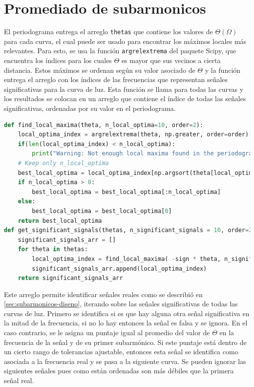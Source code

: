 \section{Promediado de subarmonicos}\label{sec:subarmonicos-implementacion}
El periodograma entrega el arreglo \texttt{thetas} que contiene los valores de $\Theta(\Omega)$ para cada curva, el cual puede ser usado para encontrar los máximos locales más relevantes. Para esto, se usa la función \texttt{argrelextrema} del paquete Scipy, que encuentra los índices para los cuales $\Theta$ es mayor que sus vecinos a cierta distancia. Estos máximos se ordenan según su valor asociado de $\Theta$ y la función entrega el arreglo con los índices de las frecuencias que representan señales significativas para la curva de luz. Esta función se llama para todas las curvas y los resultados se colocan en un arreglo que contiene el índice de todas las señales significativas, ordenadas por su valor en el periodograma.
\begin{lstlisting}[language=Python]
def find_local_maxima(theta, n_local_optima=10, order=2):
    local_optima_index = argrelextrema(theta, np.greater, order=order)[0]
    if(len(local_optima_index) < n_local_optima):
        print("Warning: Not enough local maxima found in the periodogram")
    # Keep only n_local_optima
    best_local_optima = local_optima_index[np.argsort(theta[local_optima_index])][::-1]
    if n_local_optima > 0:
        best_local_optima = best_local_optima[:n_local_optima]
    else:
        best_local_optima = best_local_optima[0]
    return best_local_optima
def get_significant_signals(thetas, n_significant_signals = 10, order=2, signal_diff_tolerance = 0.2, sign=-1, spacing=100):
    significant_signals_arr = []
    for theta in thetas:
        local_optima_index = find_local_maxima( -sign * theta, n_significant_signals, order)
        significant_signals_arr.append(local_optima_index)
    return significant_signals_arr
\end{lstlisting}
Este arreglo permite identificar señales reales como se describió en \ref{sec:subarmonicos-diseno}, iterando sobre las señales significativas de todas las curvas de luz. Primero se identifica si es que hay alguna otra señal significativa en la mitad de la frecuencia, si no lo hay entonces la señal es falsa y se ignora. En el caso contrario, se le asigna un puntaje igual al promedio del valor de $\Theta$ en la frecuencia de la señal y de su primer subarmónico. Si este puntaje está dentro de un cierto rango de tolerancias ajustable, entonces esta señal se identifica como asociada a la frecuencia real y se pasa a la siguiente curva. Se pueden ignorar las siguientes señales pues como están ordenadas son más débiles que la primera señal real.

